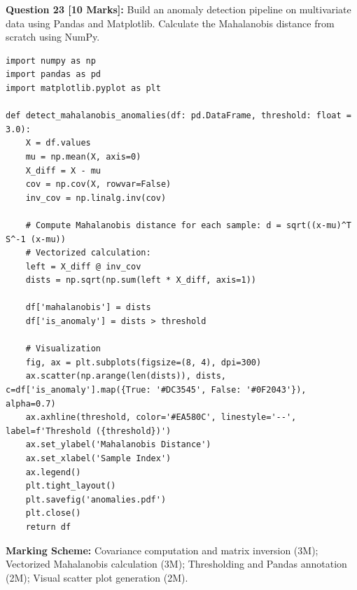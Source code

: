 \noindent\textbf{Question 23 [10 Marks]:} Build an anomaly detection pipeline on multivariate data using Pandas and Matplotlib. Calculate the Mahalanobis distance from scratch using NumPy.
\begin{solutionbox}
\begin{lstlisting}
import numpy as np
import pandas as pd
import matplotlib.pyplot as plt

def detect_mahalanobis_anomalies(df: pd.DataFrame, threshold: float = 3.0):
    X = df.values
    mu = np.mean(X, axis=0)
    X_diff = X - mu
    cov = np.cov(X, rowvar=False)
    inv_cov = np.linalg.inv(cov)
    
    # Compute Mahalanobis distance for each sample: d = sqrt((x-mu)^T S^-1 (x-mu))
    # Vectorized calculation:
    left = X_diff @ inv_cov
    dists = np.sqrt(np.sum(left * X_diff, axis=1))
    
    df['mahalanobis'] = dists
    df['is_anomaly'] = dists > threshold
    
    # Visualization
    fig, ax = plt.subplots(figsize=(8, 4), dpi=300)
    ax.scatter(np.arange(len(dists)), dists, c=df['is_anomaly'].map({True: '#DC3545', False: '#0F2043'}), alpha=0.7)
    ax.axhline(threshold, color='#EA580C', linestyle='--', label=f'Threshold ({threshold})')
    ax.set_ylabel('Mahalanobis Distance')
    ax.set_xlabel('Sample Index')
    ax.legend()
    plt.tight_layout()
    plt.savefig('anomalies.pdf')
    plt.close()
    return df
\end{lstlisting}
\end{solutionbox}
\begin{markingrubric}
\textbf{Marking Scheme:} Covariance computation and matrix inversion (3M); Vectorized Mahalanobis calculation (3M); Thresholding and Pandas annotation (2M); Visual scatter plot generation (2M).
\end{markingrubric}
